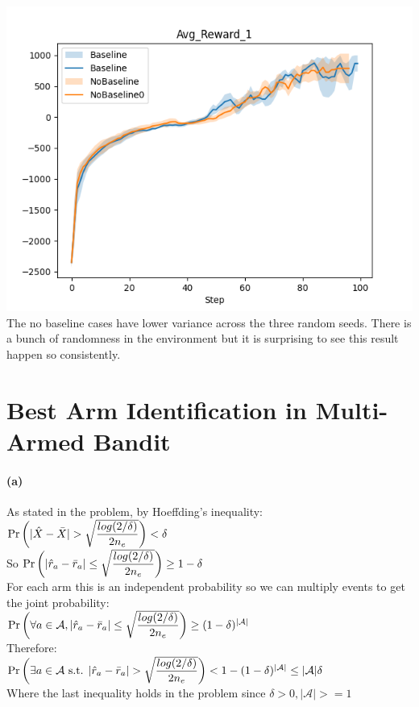 \documentclass[10pt,a4paper]{article}
\begin{document}
  \includegraphics[scale=0.5]{images/cheetah_Avg_Reward_1_combined.png} \\
  The no baseline cases have lower variance across the three random seeds.  There is a bunch of randomness in the environment but it is surprising to see this result happen so consistently.  
  
  \section{Best Arm Identification in Multi-Armed Bandit}
  \paragraph{(a)}    
  As stated in the problem, by Hoeffding's inequality: \\
  $\Pr\bigg{(}|\hat{X}-\bar{X}| > \sqrt{\dfrac{log(2/\delta)}{2n_e}}\bigg{)} < \delta$ \\
  So $\Pr\bigg{(}|\hat{r}_a-\bar{r}_a| \leq \sqrt{\dfrac{log(2/\delta)}{2n_e}}\bigg{)} \geq 1-\delta$ \\
  For each arm this is an independent probability so we can multiply events to get the joint probability: \\
  $\Pr\bigg{(}\forall a \in \mathcal{A}, |\hat{r}_a-\bar{r}_a| \leq \sqrt{\dfrac{log(2/\delta)}{2n_e}}\bigg{)} \geq (1-\delta)^{|\mathcal{A}|}$ \\
  Therefore: \\
  $\Pr\bigg{(}\exists a \in \mathcal{A} \textrm{ s.t. } |\hat{r}_a-\bar{r}_a| > \sqrt{\dfrac{log(2/\delta)}{2n_e}}\bigg{)} < 1-(1-\delta)^{|\mathcal{A}|} \leq |\mathcal{A}|\delta$ \\
  Where the last inequality holds in the problem since $\delta > 0, |\mathcal{A}| >= 1$\\
\end{document}

